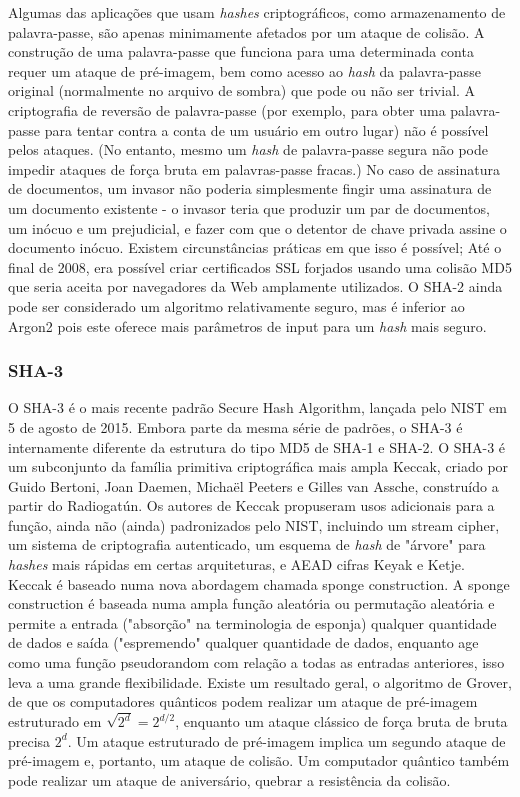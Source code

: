 \documentclass[conference]{IEEEtran}
\begin{document}
Algumas das aplicações que usam \textit{hashes} criptográficos, como armazenamento de palavra-passe, são apenas 
minimamente afetados por um ataque de colisão. A construção de uma palavra-passe que funciona para uma 
determinada conta requer um ataque de pré-imagem, bem como acesso ao \textit{hash} da palavra-passe original 
(normalmente no arquivo de sombra) que pode ou não ser trivial. A criptografia de reversão de 
palavra-passe (por exemplo, para obter uma palavra-passe para tentar contra a conta de um usuário em outro lugar) 
não é possível pelos ataques. (No entanto, mesmo um \textit{hash} de palavra-passe segura não pode impedir ataques de 
força bruta em palavras-passe fracas.)
No caso de assinatura de documentos, um invasor não poderia simplesmente fingir uma assinatura de 
um documento existente - o invasor teria que produzir um par de documentos, um inócuo e um prejudicial, 
e fazer com que o detentor de chave privada assine o documento inócuo. Existem circunstâncias 
práticas em que isso é possível; Até o final de 2008, era possível criar certificados 
SSL forjados usando uma colisão MD5 que seria aceita por navegadores da Web amplamente utilizados.
O SHA-2 ainda pode ser considerado um algoritmo relativamente seguro, mas é inferior ao Argon2 
pois este oferece mais parâmetros de input para um \textit{hash} mais seguro.

\subsubsection{SHA-3}

O SHA-3 é o mais recente padrão Secure Hash Algorithm, lançada pelo NIST em 5 de agosto de 2015. 
Embora parte da mesma série de padrões, o SHA-3 é internamente diferente da estrutura do 
tipo MD5 de SHA-1 e SHA-2.
O SHA-3 é um subconjunto da família primitiva criptográfica mais ampla Keccak, criado por 
Guido Bertoni, Joan Daemen, Michaël Peeters e Gilles van Assche, construído a partir do Radiogatún. 
Os autores de Keccak propuseram usos adicionais para a função, ainda não (ainda) padronizados pelo 
NIST, incluindo um stream cipher, um sistema de criptografia autenticado, um esquema de \textit{hash} de 
"árvore" para \textit{hashes} mais rápidas em certas arquiteturas, e AEAD cifras Keyak e Ketje.
Keccak é baseado numa nova abordagem chamada sponge construction. A sponge construction 
é baseada numa ampla função aleatória ou permutação aleatória e permite a entrada ("absorção" 
na terminologia de esponja) qualquer quantidade de dados e saída ("espremendo" qualquer 
quantidade de dados, enquanto age como uma função pseudorandom com relação a todas as 
entradas anteriores, isso leva a uma grande flexibilidade.
Existe um resultado geral, o algoritmo de Grover, de que os computadores quânticos podem 
realizar um ataque de pré-imagem estruturado em $ \sqrt {2^{d}} = {2^{d/2}}$, enquanto um ataque clássico de 
força bruta de bruta precisa $2^{d}$. Um ataque estruturado de pré-imagem implica um segundo ataque de 
pré-imagem e, portanto, um ataque de colisão. Um computador quântico também pode realizar um 
ataque de aniversário, quebrar a resistência da colisão. \cite{SHA32022}
\end{document}
